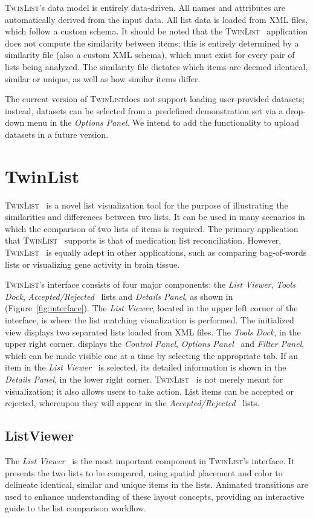 \documentclass{chi2009}
\newcommand{\TwinList}{\textsc{TwinList}}
\newcommand{\ListViewer}{\textit{List Viewer}}
\newcommand{\AcceptedRejected}{\textit{Accepted/Rejected}}
\newcommand{\Details}{\textit{Details Panel}}
\newcommand{\Tools}{\textit{Tools Dock}}
\newcommand{\Controls}{\textit{Control Panel}}
\newcommand{\Filters}{\textit{Filter Panel}}
\newcommand{\Options}{\textit{Options Panel}}
\begin{document}
\TwinList's data model is entirely data-driven. All names and attributes are automatically derived from the input data. All list data is loaded from XML files, which follow a custom schema. It should be noted that the \TwinList~ application does not compute the similarity between items; this is entirely determined by a similarity file (also a custom XML schema), which must exist for every pair of lists being analyzed. The similarity file dictates which items are deemed identical, similar or unique, as well as how similar items differ.

The current version of \TwinList does not support loading user-provided datasets; instead, datasets can be selected from a predefined demonstration set via a drop-down menu in the \Options. We intend to add the functionality to upload datasets in a future version.

\section{TwinList}
\TwinList~ is a novel list visualization tool for the purpose of illustrating the similarities and differences between two lists. It can be used in many scenarios in which the comparison of two lists of items is required. The primary application that \TwinList~ supports is that of medication list reconciliation. However, \TwinList~ is equally adept in other applications, such as comparing bag-of-words lists or visualizing gene activity in brain tissue.

\TwinList's interface consists of four major components: the \ListViewer, \Tools, \AcceptedRejected~ lists and \Details, as shown in (Figure~\ref{fig:interface}). The \ListViewer, located in the upper left corner of the interface, is where the list matching visualization is performed. The initialized view displays two separated lists loaded from XML files. The \Tools, in the upper right corner, displays the \Controls, \Options~ and \Filters, which can be made visible one at a time by selecting the appropriate tab. If an item in the \ListViewer~ is selected, its detailed information is shown in the \Details, in the lower right corner. \TwinList~ is not merely meant for visualization; it also allows users to take action. List items can be accepted or rejected, whereupon they will appear in the \AcceptedRejected~ lists.

\subsection{ListViewer}
The  \ListViewer~ is the most important component in \TwinList's interface. It presents the two lists to be compared, using spatial placement and color to delineate identical, similar and unique items in the lists. Animated transitions are used to enhance understanding of these layout concepts, providing an interactive guide to the list comparison workflow.
\end{document}
